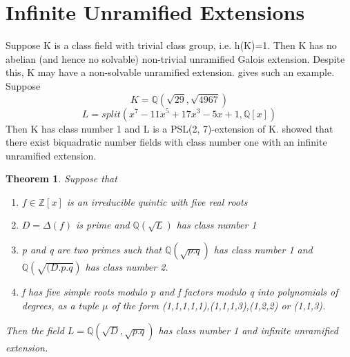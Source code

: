 \documentclass[preprint,12pt,reqno]{elsarticle}
\newtheorem{theorem}{Theorem}
\begin{document}
\section{Infinite Unramified Extensions}
Suppose K is a class field with trivial class group, i.e. h(K)=1. Then K has no abelian (and hence no
solvable) non-trivial unramified Galois extension. Despite this, K may have a non-solvable unramified extension. \cite{BRIN} gives such an example. Suppose
\begin{equation}
   K=\mathbb{Q}(\sqrt{29},\sqrt{4967}) 
\end{equation}
\begin{equation}
   L=split(x^7 - 11x^5 + 17x^3 - 5x + 1,\mathbb{Q}[x])
\end{equation}
Then K has class number 1 and L is a PSL(2, 7)-extension of K.
\cite{MAIR} showed that there exist biquadratic number fields with class number one with an infinite unramified extension. 
\begin{theorem}
\cite{BRIN} Suppose that \begin{enumerate}
    \item $f\in \mathbb{Z}[x]$ is an irreducible quintic with five real roots
    \item $D=\Delta(f)$ is prime and $\mathbb{Q}(\sqrt{L})$ has class number 1
    \item p and q are two primes such that $\mathbb{Q}(\sqrt{p.q})$ has class number 1 and $\mathbb{Q}(\sqrt{(D.p.q})$ has class number 2.
    \item f has five simple roots modulo p and f factors modulo q into polynomials of degrees, as a tuple $\mu$ of the form (1,1,1,1,1),(1,1,1,3),(1,2,2) or (1,1,3).
\end{enumerate}
Then the field $L=\mathbb{Q}(\sqrt{D},\sqrt{p.q})$ has class number 1 and infinite unramified extension.
\end{theorem}
\end{document}
